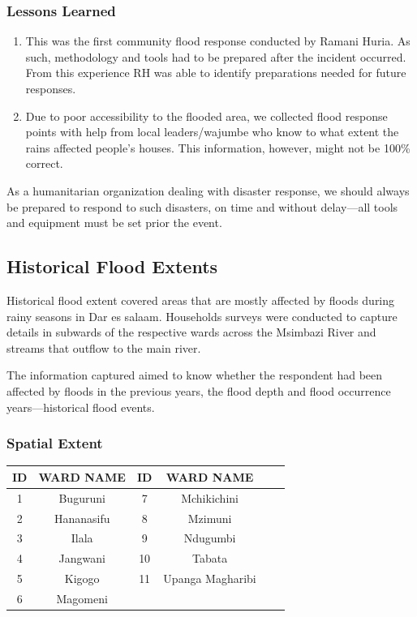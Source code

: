 \documentclass[a4paper,12pt,twoside]{article}
\begin{document}
\subsubsection{Lessons Learned}
\begin{enumerate}
    \item This was the first community flood response conducted by Ramani Huria. As such, methodology and tools had to be prepared after the incident occurred. From this experience RH was able to identify preparations needed for future responses.
    \item Due to poor accessibility to the flooded area, we collected flood response points with help from local leaders/wajumbe who know to what extent the rains affected people’s houses. This information, however, might not be 100\% correct.
\end{enumerate}
\medskip

As a humanitarian organization dealing with disaster response, we should always be prepared to respond to such disasters, on time and without delay---all tools and equipment must be set prior the event.

\newpage
\subsection{Historical Flood Extents}
Historical flood extent covered areas that are mostly affected by floods during rainy seasons in Dar es salaam. Households surveys were conducted to capture details in  subwards of the respective wards across the Msimbazi River and streams that outflow to the main river.
\medskip

The information captured aimed to know whether the respondent had been affected by floods in the previous years, the flood depth and flood occurrence years---historical flood events.


\subsubsection{Spatial Extent}

\begin{center}
\begin{tabular}{|c|c|c|c|c|c|}
\hline
ID & WARD NAME & ID & WARD NAME\\
\hline
1 & Buguruni & 7 & Mchikichini\\
2 & Hananasifu & 8 & Mzimuni\\
3 & Ilala & 9 & Ndugumbi\\
4 & Jangwani & 10 & Tabata\\
5 & Kigogo & 11 & Upanga Magharibi\\
6 &  Magomeni & {} & {} \\
 \hline
\end{tabular}
\end{center}
\end{document}
